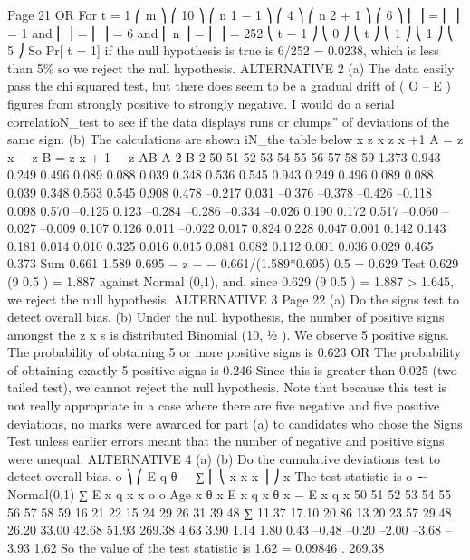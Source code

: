 \documentclass[a4paper,12pt]{article}
\begin{document}
\begin{enumerate}
Page 21 %
OR
For t = 1
⎛ m ⎞ ⎛ 10 ⎞
⎛ n 1 − 1 ⎞ ⎛ 4 ⎞
⎛ n 2 + 1 ⎞ ⎛ 6 ⎞
⎜
⎟ = ⎜ ⎟ = 1 and ⎜
⎟ = ⎜ ⎟ = 6 and ⎜ n ⎟ = ⎜ ⎟ = 252
⎝ t − 1 ⎠ ⎝ 0 ⎠
⎝ t ⎠ ⎝ 1 ⎠
⎝ 1 ⎠ ⎝ 5 ⎠
So Pr[ t = 1] if the null hypothesis is true is 6/252 = 0.0238, which is less than
5\% so we reject the null hypothesis.
ALTERNATIVE 2
(a) The data easily pass the chi squared test, but there does seem to be
a gradual drift of ( O – E ) figures from strongly positive to strongly
negative. I would do a serial correlatioN_test to see if the data displays
runs or clumps” of deviations of the same sign.
(b) The calculations are shown iN_the table below
x z x
z x +1
A = z x − z
B = z x + 1 − z
AB
A 2
B 2
50
51
52
53
54
55
56
57
58
59 1.373
0.943
0.249
0.496
0.089
0.088
0.039
0.348
0.536
0.545
0.943
0.249
0.496
0.089
0.088
0.039
0.348
0.563
0.545
0.908
0.478
–0.217
0.031
–0.376
–0.378
–0.426
–0.118
0.098
0.570
–0.125
0.123
–0.284
–0.286
–0.334
–0.026
0.190
0.172
0.517
–0.060
–0.027
–0.009
0.107
0.126
0.011
–0.022
0.017
0.824
0.228
0.047
0.001
0.142
0.143
0.181
0.014
0.010
0.325
0.016
0.015
0.081
0.082
0.112
0.001
0.036
0.029
0.465
0.373
Sum
0.661
1.589
0.695
−
z
−
−
0.661/(1.589*0.695) 0.5 = 0.629
Test 0.629 (9 0.5 ) = 1.887 against Normal (0,1), and, since
0.629 (9 0.5 ) = 1.887 > 1.645, we reject the null hypothesis.
ALTERNATIVE 3
Page 22
(a) Do the signs test to detect overall bias.
(b) Under the null hypothesis, the number of positive signs
amongst the z x s is distributed Binomial (10, 1⁄2 ). %
We observe 5 positive signs.
The probability of obtaining 5 or more positive signs is 0.623
OR
The probability of obtaining exactly 5 positive signs is 0.246
Since this is greater than 0.025 (two-tailed test), we cannot reject the
null hypothesis.
Note that because this test is not really appropriate in a case where there are five negative
and five positive deviations, no marks were awarded for part (a) to candidates who chose the
Signs Test unless earlier errors meant that the number of negative and positive signs were
unequal.
ALTERNATIVE 4
(a)
(b)
Do the cumulative deviations test to detect overall bias.
o ⎞
⎛
E
q
θ
−
∑ ⎜ ⎝ x x x ⎟ ⎠
x
The test statistic is
o
∼ Normal(0,1)
∑ E x q x
x
o
o
Age x θ x E x q x θ x − E x q x
50
51
52
53
54
55
56
57
58
59 16
21
22
15
24
29
26
31
39
48
∑ 11.37
17.10
20.86
13.20
23.57
29.48
26.20
33.00
42.68
51.93
269.38 4.63
3.90
1.14
1.80
0.43
–0.48
–0.20
–2.00
–3.68
–3.93
1.62
So the value of the test statistic is
1.62
= 0.09846 .
269.38

\end{enumerate}
\end{document}
